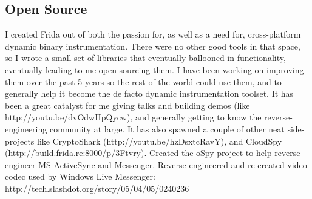 \documentclass[11pt,a4paper,sans]{moderncv}
\begin{document}
\subsection{Open Source}
{I created Frida out of both the passion for, as well as a need for,
cross-platform dynamic binary instrumentation. There were no other good
tools in that space, so I wrote a small set of libraries that eventually
ballooned in functionality, eventually leading to me open-sourcing them.
I have been working on improving them over the past 5 years so the rest
of the world could use them, and to generally help it become the de facto
dynamic instrumentation toolset. It has been a great catalyst for me giving
talks and building demos (like http://youtu.be/dvOdwHpQycw), and generally
getting to know the reverse-engineering community at large.\linebreak
\linebreak
It has also spawned a couple of other neat side-projects like
CryptoShark (http://youtu.be/hzDsxtcRavY), and
CloudSpy (http://build.frida.re:8000/p/3Ftvry).}
{Created the oSpy project to help reverse-engineer MS ActiveSync and Messenger.}
{Reverse-engineered and re-created video codec used by Windows Live Messenger:
http://tech.slashdot.org/story/05/04/05/0240236}

\nocite{*}


\end{document}

